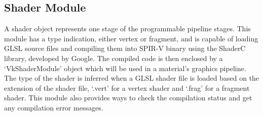 \subsection{Shader Module}
A shader object represents one stage of the programmable pipeline stages. This module has a type indication, either vertex or fragment, and is capable of loading GLSL source files and compiling them into SPIR-V binary using the ShaderC library, developed by Google. The compiled code is then enclosed by a `VkShaderModule' object which will be used in a material's graphics pipeline. The type of the shader is inferred when a GLSL shader file is loaded based on the extension of the shader file, `.vert' for a vertex shader and `.frag' for a fragment shader. This module also provides ways to check the compilation status and get any compilation error messages.
